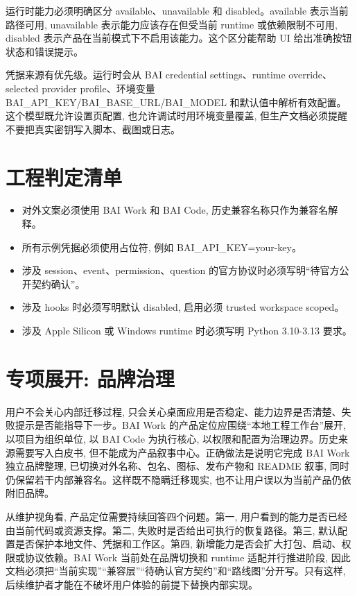 运行时能力必须明确区分 available、unavailable 和 disabled。available 表示当前路径可用, unavailable 表示能力应该存在但受当前 runtime 或依赖限制不可用, disabled 表示产品在当前模式下不启用该能力。这个区分能帮助 UI 给出准确按钮状态和错误提示。

凭据来源有优先级。运行时会从 BAI credential settings、runtime override、selected provider profile、环境变量 BAI\_API\_KEY/BAI\_BASE\_URL/BAI\_MODEL 和默认值中解析有效配置。这个模型既允许设置页配置, 也允许调试时用环境变量覆盖, 但生产文档必须提醒不要把真实密钥写入脚本、截图或日志。

\section{工程判定清单}
\begin{itemize}
  \item 对外文案必须使用 BAI Work 和 BAI Code, 历史兼容名称只作为兼容名解释。
  \item 所有示例凭据必须使用占位符, 例如 BAI\_API\_KEY=your-key。
  \item 涉及 session、event、permission、question 的官方协议时必须写明“待官方公开契约确认”。
  \item 涉及 hooks 时必须写明默认 disabled, 启用必须 trusted workspace scoped。
  \item 涉及 Apple Silicon 或 Windows runtime 时必须写明 Python 3.10-3.13 要求。
\end{itemize}

\section{专项展开: 品牌治理}
用户不会关心内部迁移过程, 只会关心桌面应用是否稳定、能力边界是否清楚、失败提示是否能指导下一步。BAI Work 的产品定位应围绕“本地工程工作台”展开, 以项目为组织单位, 以 BAI Code 为执行核心, 以权限和配置为治理边界。历史来源需要写入白皮书, 但不能成为产品叙事中心。正确做法是说明它完成 BAI Work 独立品牌整理, 已切换对外名称、包名、图标、发布产物和 README 叙事, 同时仍保留若干内部兼容名。这样既不隐瞒迁移现实, 也不让用户误以为当前产品仍依附旧品牌。

从维护视角看, 产品定位需要持续回答四个问题。第一, 用户看到的能力是否已经由当前代码或资源支撑。第二, 失败时是否给出可执行的恢复路径。第三, 默认配置是否保护本地文件、凭据和工作区。第四, 新增能力是否会扩大打包、启动、权限或协议依赖。BAI Work 当前处在品牌切换和 runtime 适配并行推进阶段, 因此文档必须把“当前实现”“兼容层”“待确认官方契约”和“路线图”分开写。只有这样, 后续维护者才能在不破坏用户体验的前提下替换内部实现。

